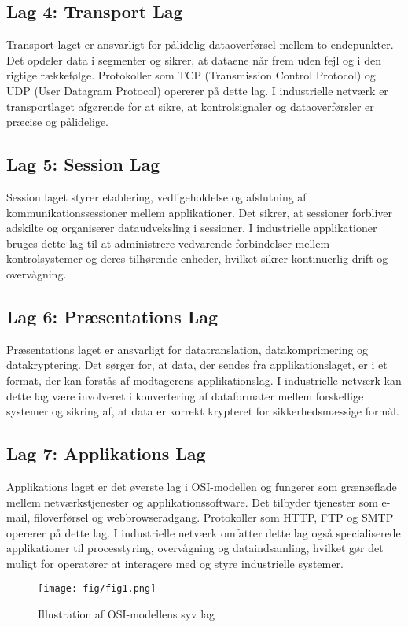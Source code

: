 \subsection{Lag 4: Transport Lag}
Transport laget er ansvarligt for pålidelig dataoverførsel mellem to endepunkter. Det opdeler data i segmenter og sikrer, at dataene når frem uden fejl og i den rigtige rækkefølge. Protokoller som TCP (Transmission Control Protocol) og UDP (User Datagram Protocol) opererer på dette lag. I industrielle netværk er transportlaget afgørende for at sikre, at kontrolsignaler og dataoverførsler er præcise og pålidelige.

\subsection{Lag 5: Session Lag}
Session laget styrer etablering, vedligeholdelse og afslutning af kommunikationssessioner mellem applikationer. Det sikrer, at sessioner forbliver adskilte og organiserer dataudveksling i sessioner. I industrielle applikationer bruges dette lag til at administrere vedvarende forbindelser mellem kontrolsystemer og deres tilhørende enheder, hvilket sikrer kontinuerlig drift og overvågning.

\subsection{Lag 6: Præsentations Lag}
Præsentations laget er ansvarligt for datatranslation, datakomprimering og datakryptering. Det sørger for, at data, der sendes fra applikationslaget, er i et format, der kan forstås af modtagerens applikationslag. I industrielle netværk kan dette lag være involveret i konvertering af dataformater mellem forskellige systemer og sikring af, at data er korrekt krypteret for sikkerhedsmæssige formål.

\subsection{Lag 7: Applikations Lag}
Applikations laget er det øverste lag i OSI-modellen og fungerer som grænseflade mellem netværkstjenester og applikationssoftware. Det tilbyder tjenester som e-mail, filoverførsel og webbrowseradgang. Protokoller som HTTP, FTP og SMTP opererer på dette lag. I industrielle netværk omfatter dette lag også specialiserede applikationer til processtyring, overvågning og dataindsamling, hvilket gør det muligt for operatører at interagere med og styre industrielle systemer.
\begin{figure}[!h]
	\centering
	\texttt{[image: fig/fig1.png]} %
	\caption{Illustration af OSI-modellens syv lag}
	\label{fig:osi_model}
\end{figure}

